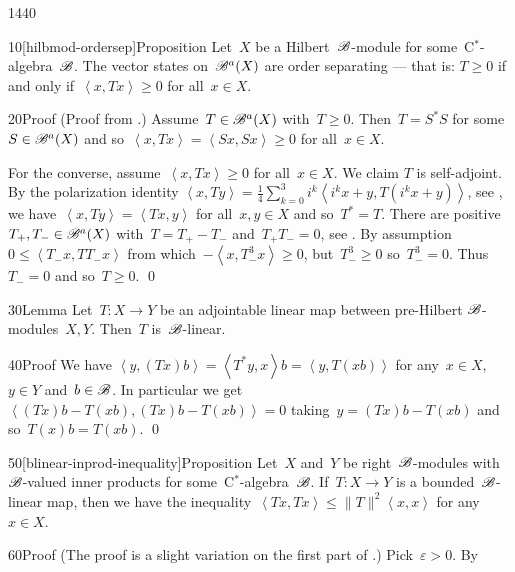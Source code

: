 \begin{parsec}{1440}%
\begin{point}{10}[hilbmod-ordersep]{Proposition}%
Let~$X$ be a Hilbert~$\mathscr{B}$-module for some~C$^*$-algebra~$\mathscr{B}$.
The vector states on~$\mathscr{B}^a(X)$ are order separating ---
that is: $T \geq 0$ if and only if~$\left<x,Tx\right> \geq 0$
for all~$x \in X$.
\begin{point}{20}{Proof}%
(Proof from \cite[Lemma 4.1]{lance}.)
Assume~$T \in \mathscr{B}^a(X)$ with~$T \geq 0$.
Then~$T = S^*S$ for some~$S \in \mathscr{B}^a(X)$
    and so~$\left<x, Tx\right> = \left<Sx,Sx\right> \geq 0$
    for all~$x \in X$.

For the converse, assume~$\left<x, Tx\right> \geq 0$
    for all~$x \in X$.
We claim $T$ is self-adjoint.
By the polarization identity
$\left<x, Ty\right>
    = \frac{1}{4} \sum^3_{k=0} i^k \left< i^k x+y, T(i^k x+y)\right>$,
    see ,
    we have~$\left<x,Ty \right> = \left<Tx, y\right>$ for all~$x,y \in X$
    and so~$T^*=T$.
There are positive~$T_+,T_- \in \mathscr{B}^a(X)$
with~$T = T_+ - T_-$ and~$T_+T_- = 0$, see .
By assumption~$0 \leq \left<T_-x,TT_-x\right>$
    from which~$-\left<x,T_-^3x\right> \geq 0$,
    but~$T_-^3 \geq 0$ so~$T_-^3 = 0$.
    Thus~$T_- = 0$ and so~$T \geq 0$. \qed
\end{point}
\end{point}
\begin{point}{30}{Lemma}%
Let~$T\colon X \to Y$
    be an adjointable linear map between pre-Hilbert $\mathscr{B}$-modules~$X,Y$.
Then~$T$ is~$\mathscr{B}$-linear.
\begin{point}{40}{Proof}%
We have
    $\left<y, (Tx)b\right>
    =\left<T^*y, x\right>b
    =\left<y, T(xb)\right>$
for any~$x \in X$, $y \in Y$ and~$b \in \mathscr{B}$.
In particular we
get~$\left<(Tx)b-T(xb), (Tx)b-T(xb)\right>=0$
taking~$y = (Tx)b-T(xb)$
    and so~$T(x)b=T(xb)$. \qed
\end{point}
\end{point}
\begin{point}{50}[blinear-inprod-inequality]{Proposition}%
Let~$X$ and~$Y$ be right~$\mathscr{B}$-modules with~$\mathscr{B}$-valued
    inner products for some~C$^*$-algebra~$\mathscr{B}$.
If~$T \colon X \to Y$ is a bounded~$\mathscr{B}$-linear map,
    then we have the
        inequality~$\left<Tx,Tx\right>\leq \|T\|^2 \left<x,x\right>$
    for any~$x \in X$.
\begin{point}{60}{Proof}
(The proof is a slight variation on the first part
of \cite[Thm.~2.8]{paschke}.)
Pick~$\varepsilon > 0$.
By 

\end{point}
\end{point}
\end{parsec}
